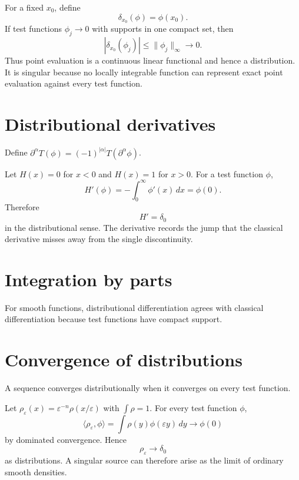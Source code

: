\begin{example}\label{ex:iii16-expand-01}
For a fixed \(x_0\), define
\[
\delta_{x_0}(\phi)=\phi(x_0).
\]
If test functions \(\phi_j\to0\) with supports in one compact set, then
\[
|\delta_{x_0}(\phi_j)|\le \|\phi_j\|_\infty\to0.
\]
Thus point evaluation is a continuous linear functional and hence a
distribution. It is singular because no locally integrable function can
represent exact point evaluation against every test function.
\end{example}
\section{Distributional derivatives}
Define $\partial^\alpha T(\phi)=(-1)^{|\alpha|}T(\partial^\alpha\phi)$.


\begin{example}\label{ex:iii16-expand-02}
Let \(H(x)=0\) for \(x<0\) and \(H(x)=1\) for \(x>0\). For a test function
\(\phi\),
\[
H'(\phi)=-\int_0^\infty \phi'(x)\,dx=\phi(0).
\]
Therefore
\[
H'=\delta_0
\]
in the distributional sense. The derivative records the jump that the
classical derivative misses away from the single discontinuity.
\end{example}
\section{Integration by parts}
For smooth functions, distributional differentiation agrees with classical differentiation because test functions have compact support.

\section{Convergence of distributions}
A sequence converges distributionally when it converges on every test function.


\begin{example}\label{ex:iii16-expand-03}
Let \(\rho_\varepsilon(x)=\varepsilon^{-n}\rho(x/\varepsilon)\) with
\(\int\rho=1\). For every test function \(\phi\),
\[
\langle \rho_\varepsilon,\phi\rangle
=\int \rho(y)\phi(\varepsilon y)\,dy
\longrightarrow \phi(0)
\]
by dominated convergence. Hence
\[
\rho_\varepsilon\to\delta_0
\]
as distributions. A singular source can therefore arise as the limit of
ordinary smooth densities.
\end{example}
